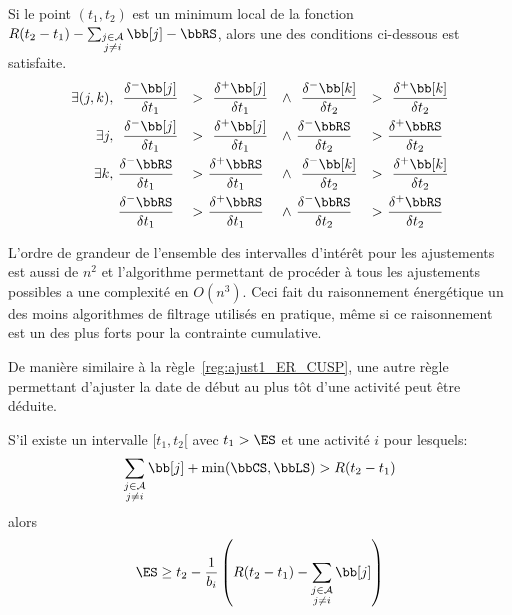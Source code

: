 \begin{lemma}
\label{lem:min_ajust_ER_CUSP}
  Si le point $(t_1,t_2)$ est un minimum local de la fonction
  $R(t_2-t_1) -\sum_{\substack{j \in \A \\ j \neq i}} \bb[j] - \bbRS
  $, alors une des conditions ci-dessous est satisfaite.
  \begin{align} 
    \exists (j,k), \ &~\frac{\delta^{-}\bb[j]}{\delta t_1}
    &>~&~\frac{\delta^{+}\bb[j]}{\delta t_1}
    &\land~&~\frac{\delta^{-}\bb[k]}{\delta t_2} & >~&
                                                       ~\frac{\delta^{+}\bb[k]}{\delta t_2} \label{eq:deriv1_adj_CUSP}\\
    \exists j , \ &~\frac{\delta^{-}\bb[j]}{\delta t_1}
    &>~&~\frac{\delta^{+}\bb[j]}{\delta t_1}
    &\land~&\frac{\delta^{-}\bbRS}{\delta t_2} & >~&
                                                        \frac{\delta^{+}\bbRS}{\delta t_2} \label{eq:deriv2_adj_CUSP}\\
    \exists k, \ &\frac{\delta^{-}\bbRS}{\delta t_1}
    &>~&\frac{\delta^{+}\bbRS}{\delta t_1}
    &\land~&~\frac{\delta^{-}\bb[k]}{\delta t_2} & >~&
                                                       ~\frac{\delta^{+}\bb[k]}{\delta t_2} \label{eq:deriv3_adj_CUSP}\\
                     &\frac{\delta^{-}\bbRS}{\delta t_1}
    &>~&\frac{\delta^{+}\bbRS}{\delta t_1}
    &\land~&\frac{\delta^{-}\bbRS}{\delta t_2} & >~&
                                                        \frac{\delta^{+}\bbRS}{\delta t_2} \label{eq:deriv4_adj_CUSP}
  \end{align}
\end{lemma}

L'ordre de grandeur de l'ensemble des intervalles d'intérêt pour les
ajustements est aussi de $n^2$ et l'algorithme permettant de procéder
à tous les ajustements possibles a une complexité en $O(n^3)$. Ceci
fait du raisonnement énergétique un des moins algorithmes de filtrage
utilisés en pratique, même si ce raisonnement est un des plus forts
pour la contrainte cumulative.


De manière similaire à la règle~\ref{reg:ajust1_ER_CUSP}, une autre
règle permettant d'ajuster la date de début au plus tôt d'une activité
peut être déduite.

\begin{reg}
  \label{reg:ajust2_ER_CUSP}
  S'il existe un intervalle $[t_1,t_2[$ avec $t_1 > \ES$ et une
activité $i$ pour lesquels:
  \[ \sum_{\substack{j \in \A \\ j \neq i}} \bb[j] +
    \min(\bbCS,\bbLS) > R (t_2-t_1)\] 
  alors 
  \[  \ES \ge t_2 - \frac{1}{b_i} \left(R (t_2-t_1)  -\sum_{\substack{j \in \A \\ j
          \neq i}} \bb[j]  \right) \]
\end{reg}

